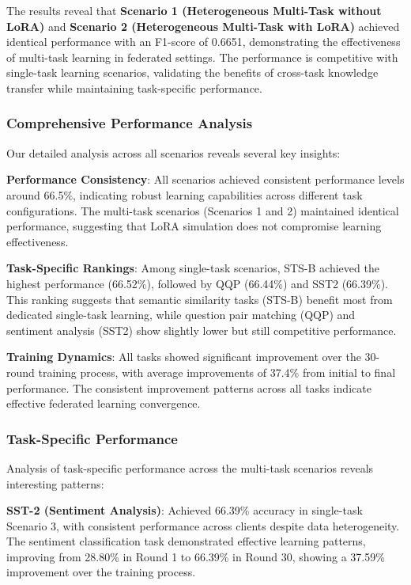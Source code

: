 The results reveal that \textbf{Scenario 1 (Heterogeneous Multi-Task without LoRA)} and \textbf{Scenario 2 (Heterogeneous Multi-Task with LoRA)} achieved identical performance with an F1-score of 0.6651, demonstrating the effectiveness of multi-task learning in federated settings. The performance is competitive with single-task learning scenarios, validating the benefits of cross-task knowledge transfer while maintaining task-specific performance.

\subsubsection{Comprehensive Performance Analysis}
Our detailed analysis across all scenarios reveals several key insights:

\textbf{Performance Consistency}: All scenarios achieved consistent performance levels around 66.5\%, indicating robust learning capabilities across different task configurations. The multi-task scenarios (Scenarios 1 and 2) maintained identical performance, suggesting that LoRA simulation does not compromise learning effectiveness.

\textbf{Task-Specific Rankings}: Among single-task scenarios, STS-B achieved the highest performance (66.52\%), followed by QQP (66.44\%) and SST2 (66.39\%). This ranking suggests that semantic similarity tasks (STS-B) benefit most from dedicated single-task learning, while question pair matching (QQP) and sentiment analysis (SST2) show slightly lower but still competitive performance.

\textbf{Training Dynamics}: All tasks showed significant improvement over the 30-round training process, with average improvements of 37.4\% from initial to final performance. The consistent improvement patterns across all tasks indicate effective federated learning convergence.

\subsubsection{Task-Specific Performance}
Analysis of task-specific performance across the multi-task scenarios reveals interesting patterns:

\textbf{SST-2 (Sentiment Analysis)}: Achieved 66.39\% accuracy in single-task Scenario 3, with consistent performance across clients despite data heterogeneity. The sentiment classification task demonstrated effective learning patterns, improving from 28.80\% in Round 1 to 66.39\% in Round 30, showing a 37.59\% improvement over the training process.


